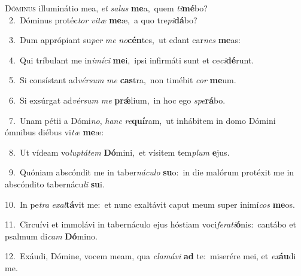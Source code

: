 \lettrine{\initial\textcolor{\initialcolor}{D}}{óminus} illuminátio mea, \textit{et} \textit{sa}\-\textit{lus} \textbf{me}\-a,~\star quem \textit{ti}\-\textbf{mé}bo?\\
{\numbfont\textcolor{\numbcolor}{~2.}}~Dóminus protéc\textit{tor} \textit{vi}\-\textit{tæ} \textbf{me}\-æ,~\star a quo tre\-\textit{pi}\-\textbf{dá}bo?\par
{\numbfont\textcolor{\numbcolor}{~3.}}~Dum apprópiant su\textit{per} \textit{me} \textit{no}\-\textbf{cén}tes,~\star ut edant car\textit{nes} \textbf{me}\-as:\par
{\numbfont\textcolor{\numbcolor}{~4.}}~Qui tríbulant me in\-\textit{i}\-\textit{mí}\textit{ci} \textbf{me}\-i,~\star ipsi infirmáti sunt et ce\-\textit{ci}\-\textbf{dé}runt.\par
{\numbfont\textcolor{\numbcolor}{~5.}}~Si consístant ad\-\textit{vér}\-\textit{sum} \textit{me} \textbf{cas}\-tra,~\star non timébit \textit{cor} \textbf{me}\-um.\par
{\numbfont\textcolor{\numbcolor}{~6.}}~Si exsúrgat ad\-\textit{vér}\-\textit{sum} \textit{me} \textbf{prǽ}\-lium,~\star in hoc ego \textit{spe}\-\textbf{rá}bo.\par
{\numbfont\textcolor{\numbcolor}{~7.}}~Unam pétii a Dómi\-\textit{no}\-, \textit{hanc} \textit{re}\-\textbf{quí}ram,~\star ut inhábitem in domo Dómini ómnibus diébus vi\textit{tæ} \textbf{me}\-æ:\par
{\numbfont\textcolor{\numbcolor}{~8.}}~Ut vídeam vo\-\textit{lup}\-\textit{tá}\textit{tem} \textbf{Dó}\-mini,~\star et vísitem tem\textit{plum} \textbf{e}\-jus.\par
{\numbfont\textcolor{\numbcolor}{~9.}}~Quóniam abscóndit me in taber\-\textit{ná}\-\textit{cu}\textit{lo} \textbf{su}\-o:~\star in die malórum protéxit me in abscóndito tabernácu\textit{li} \textbf{su}\-i.\par
{\numbfont\textcolor{\numbcolor}{10.}}~In pe\textit{tra} \textit{ex}\-\textit{al}\textbf{tá}vit me:~\star et nunc exaltávit caput meum super inimí\textit{cos} \textbf{me}\-os.\par
{\numbfont\textcolor{\numbcolor}{11.}}~Circuívi et immolávi in tabernáculo ejus hóstiam voci\-\textit{fe}\-\textit{ra}\textit{ti}\textbf{ó}nis:~\star cantábo et psalmum di\textit{cam} \textbf{Dó}\-mino.\par
{\numbfont\textcolor{\numbcolor}{12.}}~Exáudi, Dómine, vocem meam, qua \textit{cla}\-\textit{má}\textit{vi} \textbf{ad} te:~\star miserére mei, et \textit{ex}\-\textbf{áu}di me.\par
